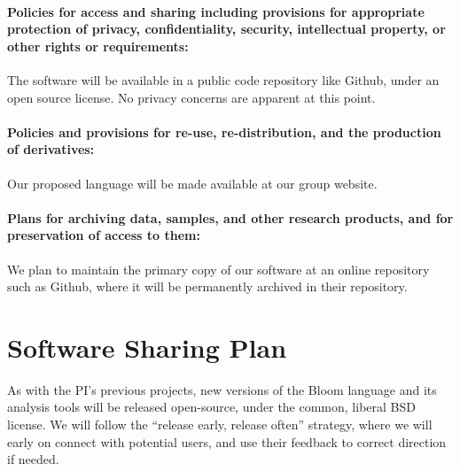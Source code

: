 \paragraph{Policies for access and sharing including provisions for
  appropriate protection of privacy, confidentiality, security,
  intellectual property, or other rights or requirements:}  The
software will be available in a public code repository like Github, under an open source license.  No privacy concerns are apparent at this point.

\paragraph{Policies and provisions for re-use, re-distribution, and
  the production of derivatives:} Our proposed language will be made
available at our group website. 

\paragraph{Plans for archiving data, samples, and other research
  products, and for preservation of access to them:}  We plan to
maintain the primary copy of our software at an online repository such as Github, where it will be permanently archived in their repository.  


\section*{Software Sharing Plan}

As with the PI's previous projects, new versions of the Bloom language and its analysis tools will be
released open-source, under the common, liberal BSD license.  We will follow the ``release early, release often''
strategy, where we will early on connect with potential users, and use
their feedback to correct direction if needed.  

